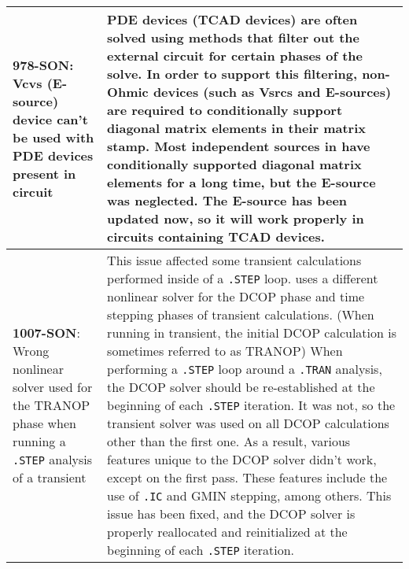 {\begin{longtable}[h] {>{\raggedright\small}m{2in}|>{\raggedright\let\\\tabularnewline\small}m{3.5in}}
     \textbf{978-SON}: Vcvs (E-source) device can't be used with PDE devices present in circuit & PDE devices
     (TCAD devices) are often solved using methods that filter out the external circuit for certain phases of the solve.
     In order to support this filtering, non-Ohmic devices (such as Vsrcs and E-sources) are required to 
     conditionally support diagonal matrix elements in their matrix stamp. 
     Most independent sources in \Xyce{} have conditionally 
     supported diagonal matrix elements for a long time, but the E-source was neglected.  The E-source 
     has been updated now, so it will work properly in circuits containing TCAD devices.
     \\ \hline

     \textbf{1007-SON}:   Wrong nonlinear solver used for the TRANOP phase when running a \texttt{.STEP} 
     analysis of a transient & This issue affected some transient calculations performed inside of 
     a \texttt{.STEP} loop.  \Xyce{} uses a different nonlinear solver for the DCOP phase and time 
     stepping phases of transient calculations.  (When running in transient, the initial DCOP 
     calculation is sometimes referred to as TRANOP)  When performing a \texttt{.STEP} loop around a \texttt{.TRAN} analysis, 
     the DCOP solver should be re-established at the beginning of each \texttt{.STEP} iteration. It was not,
     so the transient solver was used on all DCOP calculations other than the first one.  As a 
     result, various features unique to the DCOP solver didn't work, except on the first 
     pass.  These features include the use of \texttt{.IC} and GMIN stepping, among others.
     This issue has been fixed, and the DCOP solver is properly reallocated and reinitialized 
     at the beginning of each \texttt{.STEP} iteration.
\\ \hline


\end{longtable}
}
